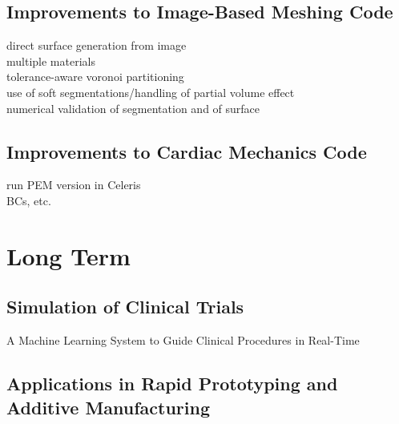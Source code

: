 \subsection{Improvements to Image-Based Meshing Code}
\label{Improvements to Image-Based Meshing Code}
direct surface generation from image \\
multiple materials \\
tolerance-aware voronoi partitioning \\
use of soft segmentations/handling of partial volume effect  \\
numerical validation of segmentation and of surface

\subsection{Improvements to Cardiac Mechanics Code}
\label{Improvements to Cardiac Mechanics Code}
run PEM version in Celeris \\
BCs, etc.

\section{Long Term}
\label{Long Term}

\subsection{Simulation of Clinical Trials}
\label{Simulation of Clinical Trials}
A Machine Learning System to Guide Clinical Procedures in Real-Time

\subsection[Applications in Rapid Prototyping and Additive Manufacturing]{\texorpdfstring{Applications in Rapid Prototyping and Additive \newline Manufacturing}{Applications in Rapid Prototyping and Additive \newline Manufacturing}}
\label{Applications in Rapid Prototyping and Additive Manufacturing}


